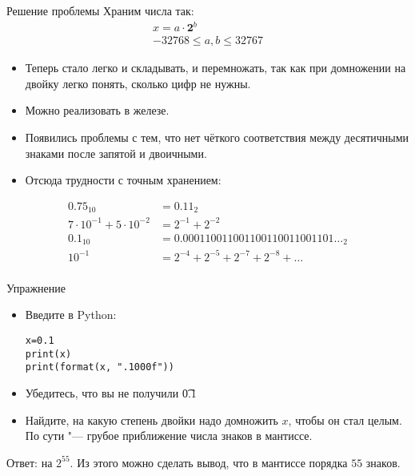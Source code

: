 \begin{frame}{Решение проблемы}
	Храним числа так:
	\begin{gather*}
		x = a \cdot \textbf{2}^b \\
		-32768 \le a, b \le 32767
	\end{gather*}
	\begin{itemize}
		\item Теперь стало легко и складывать, и перемножать, так как при домножении на двойку легко понять, сколько цифр не нужны.
		\item Можно реализовать в железе.
		\item Появились проблемы с тем, что нет чёткого соответствия между десятичными знаками после запятой и двоичными.
		\item Отсюда трудности с точным хранением:
	\end{itemize}
	\begin{align*}
		0.75_{10} &= {0.11}_{2} \\
		7 \cdot 10^{-1} + 5 \cdot 10^{-2} &= 2^{-1} + 2^{-2} \\
		0.1_{10} &= {0.000110011001100110011001101\dots}_{2} \\
		10^{-1} &= 2^{-4} + 2^{-5} + 2^{-7} + 2^{-8} + \dots \\
	\end{align*}
\end{frame}

\begin{frame}[fragile]{Упражнение}
	\begin{itemize}
		\item
			Введите в Python:
\begin{verbatim}
x=0.1
print(x)
print(format(x, ".1000f"))
\end{verbatim}
		\item
			Убедитесь, что вы не получили \t{0.1}
		\item
			Найдите, на какую степень двойки надо домножить $x$, чтобы он стал целым.
			По сути "--- грубое приближение числа знаков в мантиссе.
	\end{itemize}
	\pause
	Ответ: на $2^{55}$.
	Из этого можно сделать вывод, что в мантиссе порядка $55$ знаков.
\end{frame}
